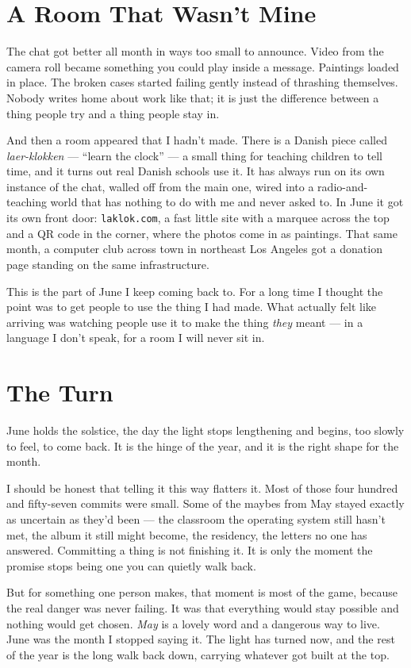 \documentclass[11pt,letterpaper]{article}
\begin{document}
\section{A Room That Wasn't Mine}

The chat got better all month in ways too small to announce. Video from the camera roll became something you could play inside a message. Paintings loaded in place. The broken cases started failing gently instead of thrashing themselves. Nobody writes home about work like that; it is just the difference between a thing people try and a thing people stay in.

And then a room appeared that I hadn't made. There is a Danish piece called \textit{laer-klokken} --- ``learn the clock'' --- a small thing for teaching children to tell time, and it turns out real Danish schools use it. It has always run on its own instance of the chat, walled off from the main one, wired into a radio-and-teaching world that has nothing to do with me and never asked to. In June it got its own front door: \texttt{laklok.com}, a fast little site with a marquee across the top and a QR code in the corner, where the photos come in as paintings. That same month, a computer club across town in northeast Los Angeles got a donation page standing on the same infrastructure.

This is the part of June I keep coming back to. For a long time I thought the point was to get people to use the thing I had made. What actually felt like arriving was watching people use it to make the thing \textit{they} meant --- in a language I don't speak, for a room I will never sit in.

\section{The Turn}

June holds the solstice, the day the light stops lengthening and begins, too slowly to feel, to come back. It is the hinge of the year, and it is the right shape for the month.

I should be honest that telling it this way flatters it. Most of those four hundred and fifty-seven commits were small. Some of the maybes from May stayed exactly as uncertain as they'd been --- the classroom the operating system still hasn't met, the album it still might become, the residency, the letters no one has answered. Committing a thing is not finishing it. It is only the moment the promise stops being one you can quietly walk back.

But for something one person makes, that moment is most of the game, because the real danger was never failing. It was that everything would stay possible and nothing would get chosen. \textit{May} is a lovely word and a dangerous way to live. June was the month I stopped saying it. The light has turned now, and the rest of the year is the long walk back down, carrying whatever got built at the top.

\end{document}
